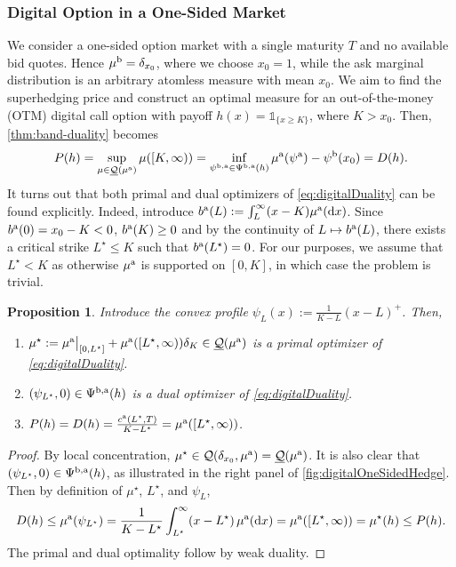 \documentclass[11pt]{article}
\newcommand{\cQ}{\mathcal{Q}}
\theoremstyle{plain}
\newtheorem{proposition}[theorem]{Proposition}
\theoremstyle{definition}
\theoremstyle{remark}
\newcommand*{\rd}{\mathrm{d}}
\theoremstyle{plain}
\begin{document}
\subsubsection{Digital Option in a One-Sided Market}\label{sec:illiquidVanillas}
We consider a one-sided option market with a single maturity $T$ and no available bid quotes. Hence  $\mu^{\rm b} = \delta_{x_0}$, where we choose $x_0=1$, while the ask marginal distribution is an arbitrary atomless measure with mean $x_0$.
We aim to find the %
superhedging price and construct an optimal measure for
an out-of-the-money (OTM) digital call option with payoff $h(x) = \mathds{1}_{\{x \ge K\}}$, where $K > x_0$. Then, \cref{thm:band-duality} becomes
\begin{equation}\label{eq:digitalDuality}
    P(h) = \sup_{\mu \in \underline{\cQ}(\mu^{\rm a})} \mu([K,\infty)) = \inf_{\psi^{\rm b,a}\in \Psi^{\rm b,a}(h)} \mu^{\rm a}(\psi^{\rm a}) - \psi^{\rm b}(x_0) = D(h).
\end{equation}
It turns out that both primal and dual optimizers of \eqref{eq:digitalDuality} can be found explicitly. 
Indeed, introduce $b^{\rm a}(L) := \int_{L}^{\infty} (x-K) \mu^{\rm a}(\rd x)$. Since $b^{\rm a}(0) = x_0 - K<0$, $b^{\rm a}(K) \geq 0$ and by the  continuity of $L\mapsto b^{\rm a}(L)$, there exists a critical strike $L^{\star} \le K$ such that $b^{\rm a}(L^\star)=0$. For our purposes,  we assume that $L^{\star} < K$ as otherwise $\mu^{\rm a}$ is supported on $[0,K]$, in which case the problem is trivial.

\begin{proposition} 
Introduce   the convex profile  $\psi_L(x):=\frac{1}{K-L}(x-L)^+$. Then, 
\begin{enumerate}[label=(\roman*)]
    \item $\mu^\star :=\mu^{\rm a}\big|_{[0,L^\star]} + \mu^{\rm a}([L^\star,\infty))\delta_K  \in \underline{\cQ}(\mu^{\rm a}) $ is a primal  optimizer of \eqref{eq:digitalDuality}. %
    \item $(\psi_{L^\star},0) \in \Psi^{\rm b,a}(h)$ is a dual  optimizer of \eqref{eq:digitalDuality}. %
    \item $P(h)=D(h)=\frac{c^{\rm a}(L^\star,T)}{K-L^\star} = \mu^{\rm a}([L^\star,\infty))$.
\end{enumerate}
\end{proposition}
\begin{proof}
%
%
By local concentration,  $\mu^\star\in \cQ(\delta_{x_0},\mu^{\rm a})=\underline{\cQ}(\mu^{\rm a})$. 
It is also clear that $(\psi_{L^\star},0)\in \Psi^{\rm b,a}(h)$, as illustrated in the right panel of \cref{fig:digitalOneSidedHedge}. Then by definition of $\mu^{\star}$, $L^{\star}$,  and $\psi_{L}$, 
\[
D(h)\leq \mu^{\rm a}(\psi_{L^\star})
= \frac{1}{K-L^\star}\int_{L^{\star}}^\infty(x-L^\star)\,\mu^{\rm a}(\rd x)
= \mu^{\rm a}([L^\star,\infty)) = \mu^{\star}(h) 
\leq P(h).
\]
 The primal and dual optimality follow by weak duality.
\end{proof}
\end{document}
